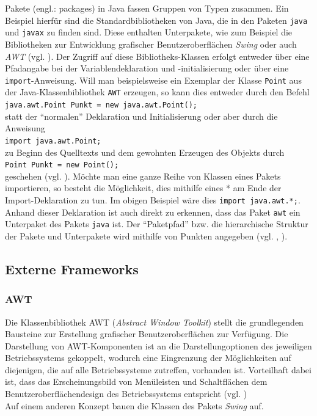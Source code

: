 \documentclass[paper=a4, DIV=calc, BCOR=12mm, twoside=on, onecolumn=on, open = right, titlepage =on, parskip =half-, headsepline = on, footsepline = off, chapterprefix = off, appendixprefix = on, fontsize = 12pt, numbers = noenddot, abstract = on]{scrbook}
\begin{document}
Pakete (engl.: packages) in Java fassen Gruppen von Typen zusammen. Ein Beispiel hierfür sind die Standardbibliotheken von Java, die in den Paketen \texttt{java} und \texttt{javax} zu finden sind. Diese enthalten Unterpakete, wie zum Beispiel die Bibliotheken zur Entwicklung grafischer Benutzeroberflächen \emph{Swing} oder auch \emph{AWT} (vgl. \cite[S.265]{ullenboom:12}).
Der Zugriff auf diese Bibliotheks-Klassen erfolgt entweder über eine Pfadangabe bei der Variablendeklaration und -initialisierung oder über eine \texttt{import}-Anweisung. Will man beispielsweise ein Exemplar der Klasse \texttt{Point} aus der Java-Klassenbibliothek \texttt{AWT} erzeugen, so kann dies entweder durch den Befehl\\
\hspace*{2em} \texttt{java.awt.Point Punkt = new java.awt.Point();}\\
statt der "`normalen"' Deklaration und Initialisierung oder aber durch die Anweisung\\ \hspace*{2em} \texttt{import java.awt.Point;}\\
zu Beginn des Quelltexts und dem gewohnten Erzeugen des Objekts durch\\
\hspace*{2em} \texttt{Point Punkt = new Point();}\\
geschehen (vgl. \cite[S.266]{ullenboom:12}).
Möchte man eine ganze Reihe von Klassen eines Pakets importieren, so besteht die Möglichkeit, dies mithilfe eines * am Ende der Import-Deklaration zu tun. Im obigen Beispiel wäre dies \texttt{import java.awt.*;}. Anhand dieser Deklaration ist auch direkt zu erkennen, dass das Paket \texttt{awt} ein Unterpaket des Pakets \texttt{java} ist. Der "`Paketpfad"' bzw. die hierarchische Struktur der Pakete und Unterpakete wird mithilfe von Punkten angegeben (vgl. \cite[S.265ff.]{ullenboom:12}, \cite[S.84ff.]{abts:15}).


\subsection{Externe Frameworks}

\subsubsection*{AWT}

Die Klassenbibliothek AWT (\emph{Abstract Window Toolkit}) stellt die grundlegenden Bausteine zur Erstellung grafischer Benutzeroberflächen zur Verfügung. Die Darstellung von AWT-Komponenten ist an die Darstellungoptionen des jeweiligen Betriebssystems gekoppelt, wodurch eine Eingrenzung der Möglichkeiten auf diejenigen, die auf alle Betriebssysteme zutreffen, vorhanden ist. Vorteilhaft dabei ist, dass das Erscheinungsbild von Menüleisten und Schaltflächen dem Benutzeroberflächendesign des Betriebssystems entspricht (vgl. \cite[S.279]{abts:15})\\
Auf einem anderen Konzept bauen die Klassen des Pakets \emph{Swing} auf. 
\end{document}
